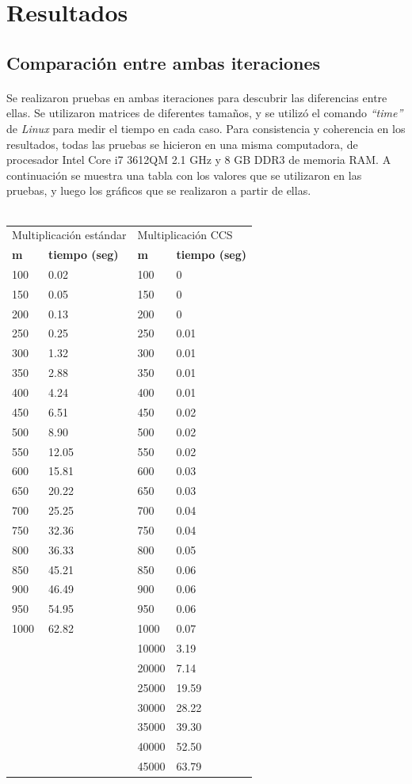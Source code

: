 \documentclass[a4paper,11pt]{article}
\begin{document}
\newpage
\section{Resultados}
\subsection{Comparaci\'on entre ambas iteraciones}
\paragraph{}
Se realizaron pruebas en ambas iteraciones para descubrir las diferencias entre
ellas. Se utilizaron matrices de diferentes tamaños, y se utiliz\'o el comando
\emph{``time''} de \emph{Linux} para medir el tiempo en cada caso. Para
consistencia y coherencia en los resultados, todas las pruebas se hicieron en
una misma computadora, de procesador Intel Core i7 3612QM 2.1 GHz y 8 GB DDR3
de memoria RAM. A continuaci\'on se muestra una tabla con los valores que se
utilizaron en las pruebas, y luego los gr\'aficos que se realizaron a partir de
ellas.\\
\\
{\centering
\begin{tabular}{|l||l|l||l|}
\hline
\multicolumn{2}{|l|}{Multiplicaci\'on est\'andar}&\multicolumn{2}{l|}{Multiplicaci\'on CCS}\\
\cline{1-4}
\textbf{m}&\textbf{tiempo (seg)}&\textbf{m}&\textbf{tiempo (seg)}\\
\hline\hline
100 & 0.02 & 100 & 0\\
150 & 0.05 & 150 & 0\\
200 & 0.13 & 200 & 0\\
250 & 0.25 & 250 & 0.01\\
300 & 1.32 & 300 & 0.01\\
350 & 2.88 & 350 & 0.01\\
400 & 4.24 & 400 & 0.01\\
450 & 6.51 & 450 & 0.02\\
500 & 8.90 & 500 & 0.02\\
550 & 12.05 & 550 & 0.02\\
600 & 15.81 & 600 & 0.03\\
650 & 20.22 & 650 & 0.03\\
700 & 25.25 & 700 & 0.04\\
750 & 32.36 & 750 & 0.04\\
800 & 36.33 & 800 & 0.05\\
850 & 45.21 & 850 & 0.06\\
900 & 46.49 & 900 & 0.06\\
950 & 54.95 & 950 & 0.06\\
1000 & 62.82 & 1000 & 0.07\\
 &  & 10000 & 3.19\\
 &  & 20000 & 7.14\\
 &  & 25000 & 19.59\\
 &  & 30000 & 28.22\\
 &  & 35000 & 39.30\\
 &  & 40000 & 52.50\\
 &  & 45000 & 63.79\\
\hline
\end{tabular}\\[6pt]
}
\end{document}
